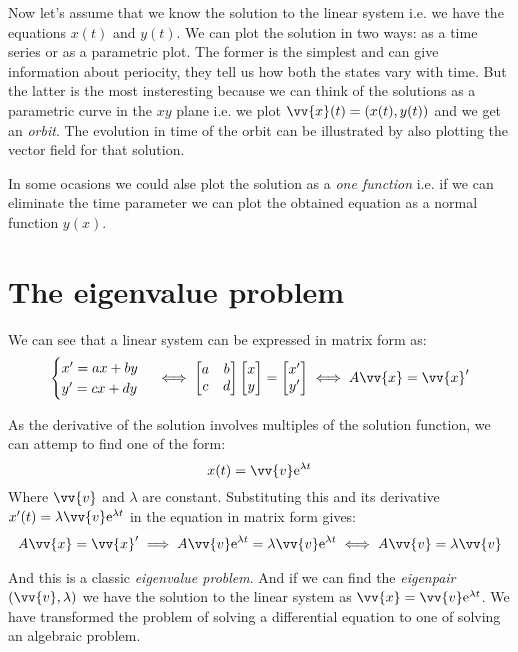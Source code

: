 \documentclass[../ode.tex]{subfiles}
\begin{document}
    Now let's assume that we know the solution to the linear system i.e. we have the equations $x(t)$ and $y(t)$. We can plot the
    solution in two ways: as a time series or as a parametric plot. The former is the simplest and can give information about
    periocity, they tell us how both the states vary with time. But the latter is the most insteresting because we can think of
    the solutions as a parametric curve in the $xy$ plane i.e. we plot $\vv{x}(t) = (x(t), y(t))$ and we get an \emph{orbit}. The
    evolution in time of the orbit can be illustrated by also plotting the vector field for that solution.

    In some ocasions we could alse plot the solution as a \emph{one function} i.e. if we can eliminate the time parameter we can
    plot the obtained equation as a normal function $y(x)$.
            
    \section{\sffamily The eigenvalue problem}
    
    We can see that a linear system can be expressed in matrix form as:
    \begin{equation*}
        \begin{cases}
            x' = ax + by\\
            y' = cx + dy
        \end{cases}
        \iff 
        \begin{bmatrix} a & b \\ c & d \end{bmatrix} \begin{bmatrix} x \\ y  \end{bmatrix} = \begin{bmatrix} x' \\ y' \end{bmatrix} 
        \iff
        A\vv{x} = \vv{x}' 
    \end{equation*}
    
    As the derivative of the solution involves multiples of the solution function, we can attemp to find one of the form:
    \begin{equation*}
        x(t) = \vv{v} \mathrm{e}^{\lambda t} 
    \end{equation*}
    Where $\vv{v} $ and $\lambda$ are constant. Substituting this and its derivative $x'(t)=\lambda \vv{v} \mathrm{e}^{\lambda t} $
    in the equation in matrix form gives:
    \begin{gather*}
        A\vv{x} = \vv{x}' \implies A\vv{v} \mathrm{e}^{\lambda t} = \lambda \vv{v} \mathrm{e}^{\lambda t} \iff A\vv{v} = \lambda
        \vv{v} 
    \end{gather*}
      
    And this is a classic \emph{eigenvalue problem}. And if we can find the \emph{eigenpair} $(\vv{v}, \lambda)$ we have the
    solution to the linear system as $\vv{x} = \vv{v} \mathrm{e}^{\lambda t} $. We have transformed the problem of solving a
    differential equation to one of solving an algebraic problem.
    
\end{document}
